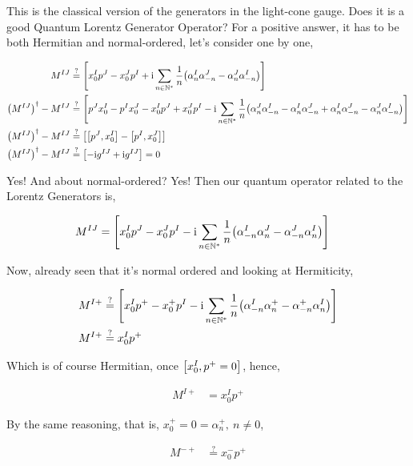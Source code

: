 This is the classical version of the generators in the light-cone gauge. Does it is a good Quantum Lorentz Generator Operator? 
For a positive answer, it has to be both Hermitian and normal-ordered, let's consider one by one,

\begin{align*}
    M^{IJ}&\stackrel{?}{=}\left[x_0^I p^J-x_0^J p^I+\im\sum\limits_{n\in\mathbb N^\ast}\frac{1}{n}\qty(\alpha^I_n\alpha^J_{-n}-\alpha^J_n\alpha^I_{-n})\right]\\
    \qty(M^{IJ})^\dagger-M^{IJ}&\stackrel{?}{=}\left[p^Jx_0^I -p^Ix_0^J -x_0^I p^J+x_0^J p^I-\im\sum\limits_{n\in\mathbb N^\ast}\frac{1}{n}\qty(\alpha^J_{n}\alpha^I_{-n}-\alpha^I_{n}\alpha^J_{-n}+\alpha^I_n\alpha^J_{-n}-\alpha^J_n\alpha^I_{-n})\right]\\
    \qty(M^{IJ})^\dagger-M^{IJ}&\stackrel{?}{=}\left[\comm{p^J}{x_0^I} -\comm{p^I}{x_0^J}\right]\\
    \qty(M^{IJ})^\dagger-M^{IJ}&\stackrel{?}{=}\left[-\im g^{IJ} +\im  g^{IJ}\right]=0
\end{align*}

Yes! And about normal-ordered? Yes! Then our quantum operator related to the Lorentz Generators is,

\begin{align*}
    M^{IJ}&=\left[x_0^I p^J-x_0^J p^I-\textnormal{i}\sum\limits_{n\in\mathbb N^\ast}\frac{1}{n}\qty(\alpha^I_{-n}\alpha^J_n-\alpha^J_{-n}\alpha^I_n)\right]
\end{align*}

Now, already seen that it's normal ordered and looking at Hermiticity,

\begin{align*}
    M^{I+}&\stackrel{?}{=}\left[x_0^I p^+-x_0^+ p^I-\textnormal{i}\sum\limits_{n\in\mathbb N^\ast}\frac{1}{n}\qty(\alpha^I_{-n}\alpha^+_{n}-\alpha^+_{-n}\alpha^I_{n})\right]\\
    M^{I+}&\stackrel{?}{=}x_0^I p^+
\end{align*}

Which is of course Hermitian, once $\comm{x_0^I}{p^+=0}$, hence,

\begin{align*}
    M^{I+}&=x_0^I p^+
\end{align*}

By the same reasoning, that is, $x_0^+=0=\alpha_n^+,\ n\neq 0$,

\begin{align*}
    M^{-+}&\stackrel{?}{=}x_0^- p^+
\end{align*}

